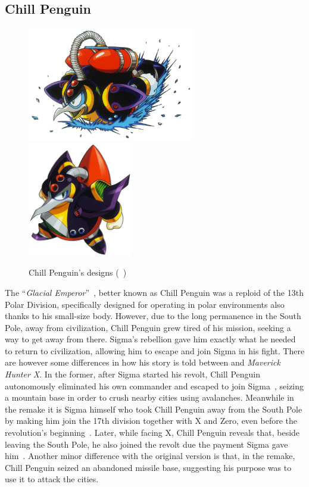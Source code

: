 \subsection{Chill Penguin}\label{boss:Chill_Penguin}
\begin{figure}[htp]
	\centering
	\includegraphics[height=5cm]{figures/X1/Chill_penguin/Chill_Penguin.jpg}
	\includegraphics[height=5cm]{figures/X1/Chill_penguin/MHXChillPenguin.jpg}
	\caption{Chill Penguin's designs (~\cite{book:MMX_Complete_art})}
\end{figure}

The ``\textit{Glacial Emperor}''~\cite{book:MMX_Complete_art}, better known as Chill Penguin was a reploid of the 13th Polar Division, specifically designed for operating in polar environments also thanks to his small-size body. However, due to the long permanence in the South Pole, away from civilization, Chill Penguin grew tired of his mission, seeking a way to get away from there. Sigma's rebellion gave him exactly what he needed to return to civilization, allowing him to escape and join Sigma in his fight. There are however some differences in how his story is told between \x and \textit{Maverick Hunter X}. In the former, after Sigma started his revolt, Chill Penguin autonomously eliminated his own commander and escaped to join Sigma~\cite{Xcoll1:Manual_X1}, seizing a mountain base in order to crush nearby cities using avalanches. Meanwhile in the remake it is Sigma himself who took Chill Penguin away from the South Pole by making him join the 17th division together with X and Zero, even before the revolution's beginning~\cite{MHX:manual}. Later, while facing X, Chill Penguin reveals that, beside leaving the South Pole, he also joined the revolt due the payment Sigma gave him~\cite{wiki:MMX_script}. Another minor difference with the original version is that, in the remake, Chill Penguin seized an abandoned missile base, suggesting his purpose was to use it to attack the cities. 

